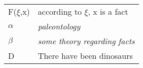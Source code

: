 \documentclass[12pt]{article}
\begin{document}
\begin{flushleft}
\begin{figure}[h]
    \centering
    \begin{subfigure}{\linewidth}
        \centering
        \begin{tabular}{l|l}
            \hline
            F($\xi$,x) & according to $\xi$, x is a fact\\
            $\alpha$ & \textit{paleontology} \\
            $\beta$ & \textit{some theory regarding facts} \\
            D & There have been dinosaurs\\
            \hline
        \end{tabular}
    \end{subfigure}\\
    \par\bigskip
    \begin{subfigure}{.20\linewidth}
        \centering
        \hspace*{2em}%
        \fitchprf
        {
            \pline{\mathnormal{\alpha}}
        }
        {
            \pline{\bigstar} \\
        }
        \caption{}
        \label{dinosaur0}
    \end{subfigure}%
    \begin{subfigure}{.20\linewidth}
        \centering
        \fitchctx
        {
            \pline{\bigstar} \\
            \subproof
            {
                \pline{\mathnormal{\alpha}}
            }
            {
            }
        }
        \caption{}
        \label{dinosaur1}
     \end{subfigure}%
    \begin{subfigure}{.20\linewidth}
        \centering
        \hspace*{2em}%
        \fitchprf
        {
        }
        {
            \pline{\bigstar} \\
            \subproof
            {
                \pline{\mathnormal{\alpha}}
            }
            {
            }
        }
        \caption{}
        \label{dinosaur2}
     \end{subfigure}%
    \begin{subfigure}{.20\linewidth}
        \centering
        \fitchctx
        {
            \pline{\bigstar} \\
}
\end{subfigure}
\end{figure}
\end{flushleft}
\end{document}
